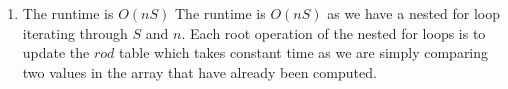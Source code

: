 \documentclass{article}
\begin{document}
\begin{enumerate}
\begin{algorithmic}
            \EndFunction        
        \end{algorithmic}

    \item The runtime is $O(nS)$
            The runtime is $O(nS)$ as we have a nested for loop iterating through $S$ and $n$.
            Each root operation of the nested for loops is to update the $rod$ table which takes constant time as we are simply comparing two values in the array that have already been computed.
\end{enumerate}
\end{document}
